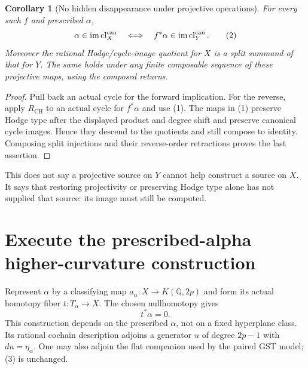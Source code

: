 \documentclass[11pt]{article}
\newtheorem{corollary}[theorem]{Corollary}
\newcommand{\Q}{\mathbb Q}
\newcommand{\CH}{\operatorname{CH}}
\newcommand{\cl}{\operatorname{cl}^{\rm can}}
\begin{document}
\begin{corollary}[No hidden disappearance under projective operations]\label{cor:defect}
For every such $f$ and prescribed $\alpha$,
\[
 \alpha\in\operatorname{im}\cl_X
 \quad\Longleftrightarrow\quad
 f^*\alpha\in\operatorname{im}\cl_Y.                \tag{2}
\]
Moreover the rational Hodge/cycle-image quotient for $X$ is a split
summand of that for $Y$. The same holds under any finite composable
sequence of these projective maps, using the composed returns.
\end{corollary}
\begin{proof}
Pull back an actual cycle for the forward implication. For the reverse,
apply $R_{\CH}$ to an actual cycle for $f^*\alpha$ and use (1).
The maps in (1) preserve Hodge type after the displayed product and
degree shift and preserve canonical cycle images. Hence they descend
to the quotients and still compose to identity. Composing split injections
and their reverse-order retractions proves the last assertion.
\end{proof}
This does not say a projective source on $Y$ cannot help construct a source
on $X$. It says that restoring projectivity or preserving Hodge type alone
has not supplied that source: its image must still be computed.

\section{Execute the prescribed-alpha higher-curvature construction}
Represent $\alpha$ by a classifying map $a_\alpha:X\to K(\Q,2p)$ and form
its actual homotopy fiber $t:T_\alpha\to X$. The chosen nullhomotopy gives
\[
 t^*\alpha=0.                                      \tag{3}
\]
This construction depends on the prescribed $\alpha$, not on a fixed
hyperplane class. Its rational cochain description adjoins a generator
$u$ of degree $2p-1$ with $du=\eta_\alpha$. One may also adjoin the
flat companion used by the paired GST model; (3) is unchanged.
\end{document}
